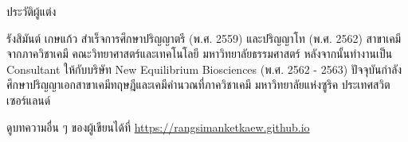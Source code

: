 

{
\thispagestyle{empty}

\begin{center}
    ประวัติผู้แต่ง
\end{center}

รังสิมันต์ เกษแก้ว สำเร็จการศึกษาปริญญาตรี (พ.ศ. 2559) และปริญญาโท (พ.ศ. 2562) สาขาเคมี จากภาควิชาเคมี 
คณะวิทยาศาสตร์และเทคโนโลยี มหาวิทยาลัยธรรมศาสตร์ หลังจากนั้นทำงานเป็น Consultant ให้กับบริษัท New Equilibrium Biosciences 
(พ.ศ. 2562 - 2563) ปัจจุบันกำลังศึกษาปริญญาเอกสาขาเคมีทฤษฎีและเคมีคำนวณที่ภาควิชาเคมี มหาวิทยาลัยแห่งซูริค ประเทศสวิตเซอร์แลนด์

\noindent ดูบทความอื่น ๆ ของผู้เขียนได้ที่ \url{https://rangsimanketkaew.github.io}

\vfill
}
